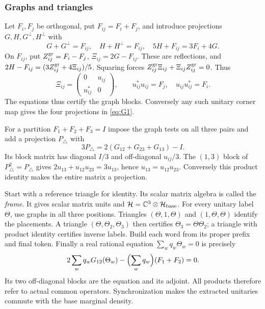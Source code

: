 \subsubsection{Graphs and triangles}
Let $F_i,F_j$ be orthogonal, put $F_{ij}=F_i+F_j$, and introduce projections $G,H,G^\perp,H^\perp$ with
\begin{equation}\label{eq:G1}
 G+G^\perp=F_{ij},\quad H+H^\perp=F_{ij},\quad 5H+F_{ij}=3F_i+4G.
\end{equation}
On $F_{ij}$, put ${Z_{ij}^{\rm gr}}=F_i-F_j$, $\Xi_{ij}=2G-F_{ij}$. These are reflections, and $2H-F_{ij}=(3{Z_{ij}^{\rm gr}}+4\Xi_{ij})/5$. Squaring forces ${Z_{ij}^{\rm gr}}\Xi_{ij}+\Xi_{ij}{Z_{ij}^{\rm gr}}=0$. Thus
\[
 \Xi_{ij}=\begin{pmatrix}0&u_{ij}\\u_{ij}^*&0\end{pmatrix},\qquad
 u_{ij}^*u_{ij}=F_j,\quad u_{ij}u_{ij}^*=F_i.
\]
The equations thus certify the graph blocks. Conversely any such unitary corner map gives the four projections in \eqref{eq:G1}.

For a partition $F_1+F_2+F_3=I$ impose the graph tests on all three pairs and add a projection $P_\triangle$ with
\begin{equation}\label{eq:G2}
 3P_\triangle=2(G_{12}+G_{23}+G_{13})-I.
\end{equation}
Its block matrix has diagonal $I/3$ and off-diagonal $u_{ij}/3$. The $(1,3)$ block of $P_\triangle^2=P_\triangle$ gives $2u_{13}+u_{12}u_{23}=3u_{13}$, hence $u_{13}=u_{12}u_{23}$. Conversely this product identity makes the entire matrix a projection.

Start with a reference triangle for identity. Its scalar matrix algebra is called the \emph{frame}. It gives scalar matrix units and $\mathcal H=\mathbb C^3\otimes\mathcal H_{\rm base}$. For every unitary label $\Theta$, use graphs in all three positions. Triangles $(\Theta,1,\Theta)$ and $(1,\Theta,\Theta)$ identify the placements. A triangle $(\Theta,\Theta_2,\Theta_3)$ then certifies $\Theta_3=\Theta\Theta_2$; a triangle with product identity certifies inverse labels. Build each word from its proper prefix and final token. Finally a real rational equation $\sum_wq_w\Theta_w=0$ is precisely
\begin{equation}\label{eq:G3}
 2\sum_wq_wG_{12}(\Theta_w)-\Bigl(\sum_wq_w\Bigr)(F_1+F_2)=0.
\end{equation}
Its two off-diagonal blocks are the equation and its adjoint. All products therefore refer to actual common operators. Synchronization makes the extracted unitaries commute with the base marginal density.

